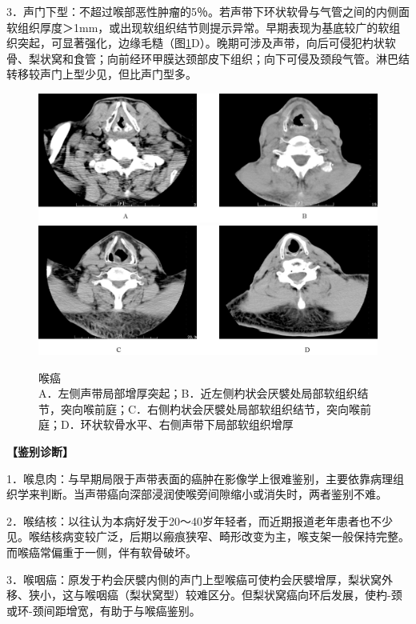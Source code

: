 3．声门下型：不超过喉部恶性肿瘤的5％。若声带下环状软骨与气管之间的内侧面软组织厚度＞1mm，或出现软组织结节则提示异常。早期表现为基底较广的软组织突起，可显著强化，边缘毛糙（图\ref{fig6-10}D）。晚期可涉及声带，向后可侵犯杓状软骨、梨状窝和食管；向前经环甲膜达颈部皮下组织；向下可侵及颈段气管。淋巴结转移较声门上型少见，但比声门型多。



\begin{figure}[!htbp]
 \centering
 \includegraphics[width=.7\textwidth,height=\textheight,keepaspectratio]{./images/Image00152.jpg}
 \includegraphics[width=.7\textwidth,height=\textheight,keepaspectratio]{./images/Image00153.jpg}
 \captionsetup{justification=centering}
 \caption{喉癌\\{\small A．左侧声带局部增厚突起；B．近左侧杓状会厌襞处局部软组织结节，突向喉前庭；C．右侧杓状会厌襞处局部软组织结节，突向喉前庭；D．环状软骨水平、右侧声带下局部软组织增厚}}
 \label{fig6-10}
  \end{figure} 

\textbf{【鉴别诊断】}

1．喉息肉：与早期局限于声带表面的癌肿在影像学上很难鉴别，主要依靠病理组织学来判断。当声带癌向深部浸润使喉旁间隙缩小或消失时，两者鉴别不难。

2．喉结核：以往认为本病好发于20～40岁年轻者，而近期报道老年患者也不少见。喉结核病变较广泛，后期以瘢痕狭窄、畸形改变为主，喉支架一般保持完整。而喉癌常偏重于一侧，伴有软骨破坏。

3．喉咽癌：原发于杓会厌襞内侧的声门上型喉癌可使杓会厌襞增厚，梨状窝外移、狭小，这与喉咽癌（梨状窝型）较难区分。但梨状窝癌向环后发展，使杓-颈或环-颈间距增宽，有助于与喉癌鉴别。

\protect\hypertarget{text00014.html}{}{}

